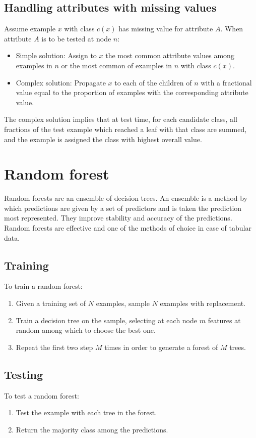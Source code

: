 	\subsection{Handling attributes with missing values}
	Assume example $x$ with class $c(x)$ has missing value for attribute $A$.
	When attribute $A$ is to be tested at node $n$:
	\begin{itemize}
		\item Simple solution: Assign to $x$ the most common attribute values among examples in $n$ or the most common of examples in $n$ with class $c(x)$.
		\item Complex solution: Propagate $x$ to each of the children of $n$ with a fractional value equal to the proportion of examples with the corresponding attribute value.
	\end{itemize}
	The complex solution implies that at test time, for each candidate class, all fractions of the test example which reached a leaf with that class are summed, and the example is assigned the class with highest overall value.

\section{Random forest}
Random forests are an ensemble of decision trees.
An ensemble is a method by which predictions are given by a set of predictors and is taken the prediction most represented.
They improve stability and accuracy of the predictions.
Random forests are effective and one of the methods of choice in case of tabular data.

	\subsection{Training}
	To train a random forest:

	\begin{enumerate}
		\item Given a training set of $N$ examples, sample $N$ examples with replacement.
		\item Train a decision tree on the sample, selecting at each node $m$ features at random among which to choose the best one.
		\item Repeat the first two step $M$ times in order to generate a forest of $M$ trees.
	\end{enumerate}

	\subsection{Testing}
	To test a random forest:

	\begin{enumerate}
		\item Test the example with each tree in the forest.
		\item Return the majority class among the predictions.
	\end{enumerate}

